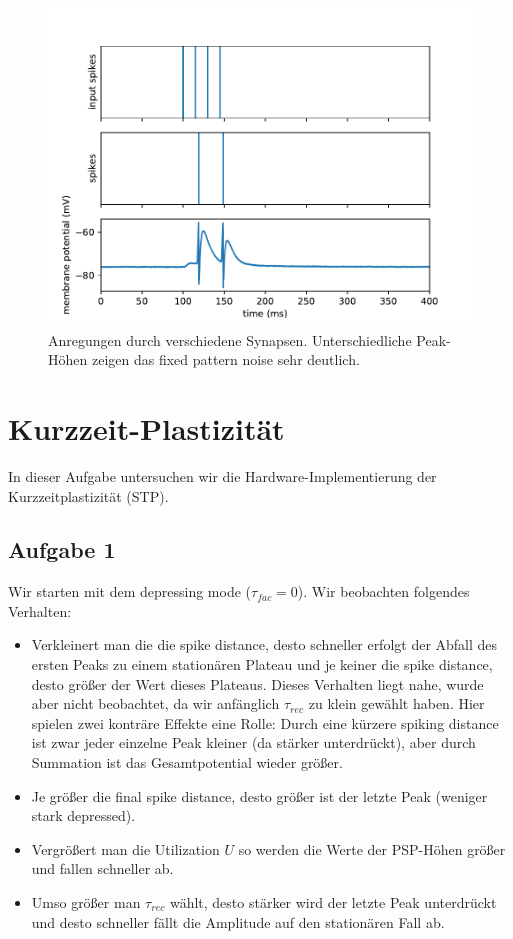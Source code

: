 \documentclass[10pt,a4paper]{scrartcl}
\begin{document}
\begin{figure} [ht]
\begin{center}
\label{fig:abb10}
\caption{Anregungen durch verschiedene Synapsen. Unterschiedliche Peak-Höhen zeigen das fixed pattern noise sehr deutlich.}
\includegraphics[scale=0.5]{pictures/resonant_firing.pdf} 
\end{center}
\end{figure}


\newpage


\section{Kurzzeit-Plastizität}
In dieser Aufgabe untersuchen wir die Hardware-Implementierung der Kurzzeitplastizität (STP). 

\subsection{Aufgabe 1}
Wir starten mit dem depressing mode ($\tau_{fac} = 0$). Wir beobachten folgendes Verhalten:
\begin{itemize}
\item Verkleinert man die die spike distance, desto schneller erfolgt der Abfall des ersten Peaks zu einem stationären Plateau und je keiner die spike distance, desto größer der Wert dieses Plateaus. Dieses Verhalten liegt nahe, wurde aber nicht beobachtet, da wir anfänglich $\tau_{rec}$ zu klein gewählt haben. Hier spielen zwei konträre Effekte eine Rolle: Durch eine kürzere spiking distance ist zwar jeder einzelne Peak kleiner (da stärker unterdrückt), aber durch Summation ist das Gesamtpotential wieder größer.
\item Je größer die final spike distance, desto größer ist der letzte Peak (weniger stark depressed).
\item Vergrößert man die Utilization $U$ so werden die Werte der PSP-Höhen größer und fallen schneller ab.
\item Umso größer man $\tau_{rec}$ wählt, desto stärker wird der letzte Peak unterdrückt und desto schneller fällt die Amplitude auf den stationären Fall ab.
\end{itemize} 
\end{document}
